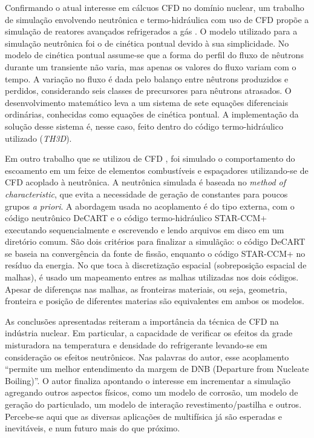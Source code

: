 Confirmando o atual interesse em cálcuos CFD no domínio nuclear, um trabalho de simulação envolvendo
neutrônica e termo-hidráulica com uso de CFD propõe a simulação de reatores avançados refrigerados
a gás \cite{Hossain2011}. O modelo utilizado 
para a simulação neutrônica foi o de cinética pontual devido à sua simplicidade. No modelo 
de cinética pontual assume-se que a forma do perfil do fluxo de nêutrons durante um transiente 
não varia, mas apenas os valores do fluxo variam com o tempo. A variação no fluxo é dada 
pelo balanço entre nêutrons produzidos e perdidos, considerando seis classes de precursores 
para nêutrons atrasados. O desenvolvimento matemático leva a um sistema de sete equações diferenciais 
ordinárias, conhecidas como equações de cinética pontual. A implementação da solução desse sistema 
é, nesse caso, feito dentro do código termo-hidráulico utilizado (\textit{TH3D}).

Em outro trabalho que se utilizou de CFD \cite{Yan2011}, foi simulado o comportamento do escoamento em um feixe de elementos 
combustíveis e espaçadores utilizando-se de CFD acoplado à neutrônica. A neutrônica 
simulada é baseada no \textit{method of characteristic}, que evita a necessidade de geração 
de constantes para poucos grupos \textit{a priori}. A abordagem usada no 
acoplamento é do tipo externa, com o código neutrônico DeCART e o código termo-hidráulico 
STAR-CCM+ executando sequencialmente e escrevendo e lendo arquivos em disco em um 
diretório comum. São dois critérios para finalizar a simulãção: o código DeCART se baseia 
na convergência da fonte de fissão, enquanto o código STAR-CCM+ no resíduo da energia. No que toca à 
discretização espacial (sobreposição espacial de malhas), é usado um mapeamento entres as malhas 
utilizadas nos dois códigos. Apesar de diferenças nas malhas, as fronteiras materiais, ou seja, geometria, 
fronteira e posição de diferentes materias são equivalentes em ambos os modelos.

As conclusões apresentadas reiteram a importância da técnica de CFD na indústria nuclear. Em particular, 
a capacidade de verificar os efeitos da grade misturadora na temperatura e densidade do refrigerante 
levando-se em consideração os efeitos neutrônicos. Nas palavras do autor, esse acoplamento 
``permite um melhor entendimento da margem de DNB (Departure from Nucleate Boiling)''.
O autor finaliza apontando o interesse em incrementar a simulação 
agregando outros aspectos físicos, como um modelo de corrosão, um modelo de geração do particulado, 
um modelo de interação revestimento/pastilha e outros. Percebe-se aqui que as diversas aplicações 
de multifísica já são esperadas e inevitáveis, e num futuro mais do que próximo.

